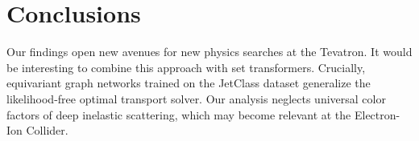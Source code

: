 \section{Conclusions}\label{sec:conclusions}

Our findings open new avenues for new physics searches at the Tevatron.
It would be interesting to combine this approach with set transformers.
Crucially, equivariant graph networks trained on the JetClass dataset
generalize the likelihood-free optimal transport solver. Our analysis
neglects universal color factors of deep inelastic scattering, which may
become relevant at the Electron-Ion Collider.

